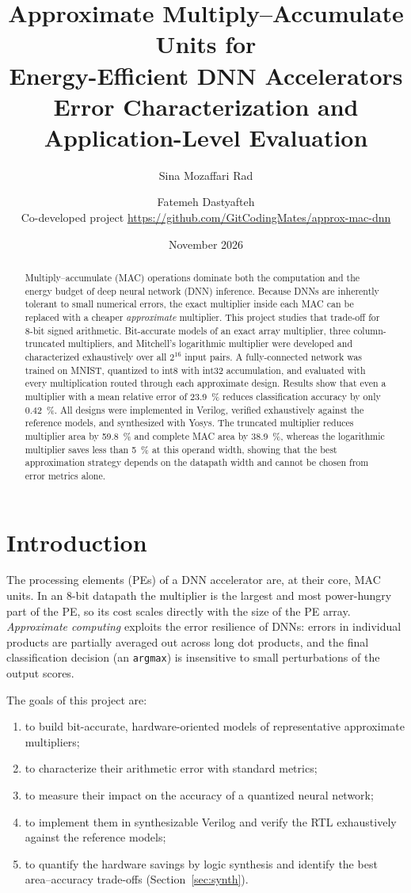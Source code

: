 \documentclass[11pt,a4paper]{article}
\title{\textbf{Approximate Multiply--Accumulate Units for\\Energy-Efficient DNN Accelerators}\\[4pt]
       \large Error Characterization and Application-Level Evaluation}
\author{Sina Mozaffari Rad \and Fatemeh Dastyafteh\\[4pt]
        \small Co-developed project\quad\textbar\quad
        \url{https://github.com/GitCodingMates/approx-mac-dnn}}
\date{November 2026}
\begin{document}
\maketitle

\begin{abstract}
Multiply--accumulate (MAC) operations dominate both the computation and the
energy budget of deep neural network (DNN) inference. Because DNNs are
inherently tolerant to small numerical errors, the exact multiplier inside each
MAC can be replaced with a cheaper \emph{approximate} multiplier. This project
studies that trade-off for 8-bit signed arithmetic. Bit-accurate models of an
exact array multiplier, three column-truncated multipliers, and Mitchell's
logarithmic multiplier were developed and characterized exhaustively over all
$2^{16}$ input pairs. A fully-connected network was trained on MNIST,
quantized to int8 with int32 accumulation, and evaluated with every
multiplication routed through each approximate design. Results show that even
a multiplier with a mean relative error of \SI{23.9}{\percent} reduces
classification accuracy by only \SI{0.42}{\percent}. All designs were
implemented in Verilog, verified exhaustively against the reference models,
and synthesized with Yosys. The truncated multiplier reduces multiplier area by
\SI{59.8}{\percent} and complete MAC area by \SI{38.9}{\percent}, whereas
the logarithmic multiplier saves less than \SI{5}{\percent} at this operand
width, showing that the best approximation strategy depends on the datapath
width and cannot be chosen from error metrics alone.
\end{abstract}

\section{Introduction}
The processing elements (PEs) of a DNN accelerator are, at their core, MAC
units. In an 8-bit datapath the multiplier is the largest and most
power-hungry part of the PE, so its cost scales directly with the size of the
PE array. \emph{Approximate computing} exploits the error resilience of
DNNs: errors in individual products are partially averaged out across long dot
products, and the final classification decision (an \texttt{argmax}) is
insensitive to small perturbations of the output scores.

The goals of this project are:
\begin{enumerate}[nosep]
  \item to build bit-accurate, hardware-oriented models of representative
        approximate multipliers;
  \item to characterize their arithmetic error with standard metrics;
  \item to measure their impact on the accuracy of a quantized neural network;
  \item to implement them in synthesizable Verilog and verify the RTL
        exhaustively against the reference models;
  \item to quantify the hardware savings by logic synthesis and identify
        the best area--accuracy trade-offs (Section~\ref{sec:synth}).
\end{enumerate}
\end{document}

